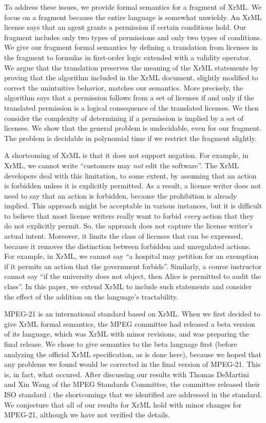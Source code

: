 \documentclass{acmtrans2m}
\newcommand{\<}{
}
\renewcommand{\>}{\rangle}
\begin{document}
To address these issues, we provide formal semantics for
a fragment of XrML.
We focus on a fragment because the entire language is somewhat unwieldy.
An
XrML license says that an agent grants a permission if certain
conditions hold.
Our
fragment includes only two types of permissions and only two types of conditions.
We give our fragment formal semantics by defining
a translation from licenses in
the fragment
to formulas in
first-order logic extended with a validity operator.  We argue that the translation
preserves the meaning of the XrML statements by proving that the algorithm included
in the XrML document, slightly modified to correct the unintuitive
behavior, 
matches our semantics.  More precisely, the algorithm says that a
permission follows from a 
set of licenses if and only if the translated permission is a logical
consequence of 
the translated licenses.  We then consider the complexity of determining if a
permission is implied by a set of licenses.  We show that the general problem is
undecidable, even for our fragment.
The problem is decidable in polynomial time if we restrict the fragment slightly.



A shortcoming of XrML is that it does not support negation.  For example, in XrML,
we cannot write ``customers may \emph{not} edit the software''.  The XrML developers
deal with this limitation, to some extent, by assuming that an action is forbidden
unless it is explicitly permitted.  As a result, a license writer does not need to say
that an action is forbidden, because the prohibition is already implied.  This
approach might be acceptable in various instances, but it is difficult to believe that
most license writers really want to forbid \emph{every} action that they do not
explicitly permit.  So, the approach does not capture the license writer's actual intent.
Moreover, it limits the class of licenses that can be expressed, because it removes the
distinction between forbidden and unregulated actions.  For example, in XrML, we cannot
say ``a hospital may petition for an exemption if it permits an action that the government
forbids''.  Similarly, a course instructor cannot say ``if the university does not object,
then Alice is permitted to audit the class''.  In this paper, we extend XrML to include
such statements and consider the effect of the addition on the language's tractability.

MPEG-21 is an international standard based on XrML.  When we first decided to give XrML
formal semantics, the MPEG committee had released a beta version of its language, which was
XrML with minor revisions, and was preparing the final release.  We chose to give semantics
to the beta language first (before analyzing the official XrML specification, as is done
here), because we hoped that any problems we found would be corrected in the final version
of MPEG-21.  This is, in fact, what occured.  After discussing our results with Thomas
DeMartini and Xin Wang of the MPEG Standards Committee, the committee released their ISO
standard \cite{RelFinal}; the shortcomings that we identified are addressed in the standard.
We conjecture that all of our results for XrML hold with minor changes for MPEG-21, although
we have not verified the details.
\end{document}
